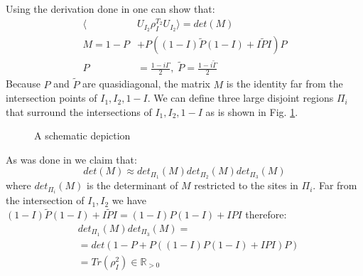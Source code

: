 \documentclass[%
 reprint,
 amsmath,amssymb,
 aps,
]{revtex4-2}
\begin{document}
Using the derivation done in \cite{gass2025} one can show that:
\begin{equation}
    \begin{split}
    \langle &U_{I_2}\rho_I^{T_2}U_{I_2} \rangle = det(M) \\
    M=1-P&+P \left( (1-I)\tilde P(1-I) + I\tilde PI \right) P \\
    P&=\frac{1-i\Gamma}{2}, \; \tilde P=\frac{1-i\tilde\Gamma}{2}
    \end{split}
\end{equation}
Because $P$ and $\tilde P$ are quasidiagonal, the matrix $M$ is the identity far from the intersection points of $I_1,I_2,1-I$. We can define three large disjoint regions $\Pi_i$ that surround the intersections of $I_1,I_2,1-I$ as is shown in Fig. \ref{fig:interval shcematic}.
\begin{figure}[b]
    \caption{\label{fig:interval shcematic} A schematic depiction}
\end{figure}
As was done in \cite{shap2017} we claim that:
\begin{equation}
    det(M)\approx det_{\Pi_1}(M) det_{\Pi_2}(M) det_{\Pi_3}(M)
\end{equation}
where $det_{\Pi_i}(M)$ is the determinant of $M$ restricted to the sites in $\Pi_i$.
Far from the intersection of $I_1, I_2$ we have $(1-I)\tilde P(1-I) + I\tilde PI = (1-I)P(1-I) + IPI$ therefore:
\begin{equation}
    \begin{split}
        &det_{\Pi_1}(M) det_{\Pi_3}(M) = \\
        &= det(1-P+P \left( (1-I)P(1-I) + IPI \right) P) \\
        &= Tr(\rho_I^2)\in\mathbb{R}_{>0}
    \end{split}
\end{equation}
\end{document}
